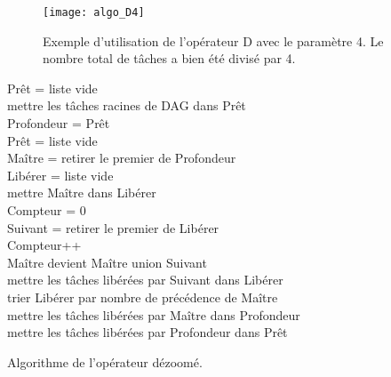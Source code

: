 \begin{figure}
  \centering
  \texttt{[image: algo\_D4]}
  \caption{Exemple d'utilisation de l'opérateur D avec le paramètre 4. Le nombre total de tâches a bien été divisé par 4.}
  \label{fig:algo_D4}
\end{figure}
\begin{algorithm}
  {\sc Prêt} = liste vide \\
  mettre les tâches racines de DAG dans {\sc Prêt} \\
   {
    {\sc Profondeur} = {\sc Prêt} \\
    {\sc Prêt} = liste vide \\
     {
      {\sc Maître} = retirer le premier de {\sc Profondeur} \\
      {\sc Libérer} = liste vide \\
      mettre {\sc Maître} dans {\sc Libérer} \\
      {\sc Compteur} = 0 \\
       {
        {\sc Suivant} = retirer le premier de {\sc Libérer} \\
        {\sc Compteur}++\\
        {\sc Maître} devient {\sc Maître} union {\sc Suivant}\\
        mettre les tâches libérées par {\sc Suivant} dans {\sc Libérer} \\
        trier {\sc Libérer} par nombre de précédence de {\sc Maître} \\
      }
      mettre les tâches libérées par {\sc Maître} dans {\sc Profondeur} \\
    }
    mettre les tâches libérées par {\sc Profondeur} dans {\sc Prêt}\\
  }
  \caption{Algorithme de l'opérateur dézoomé.}
  \label{algo:algo_D}
\end{algorithm}
